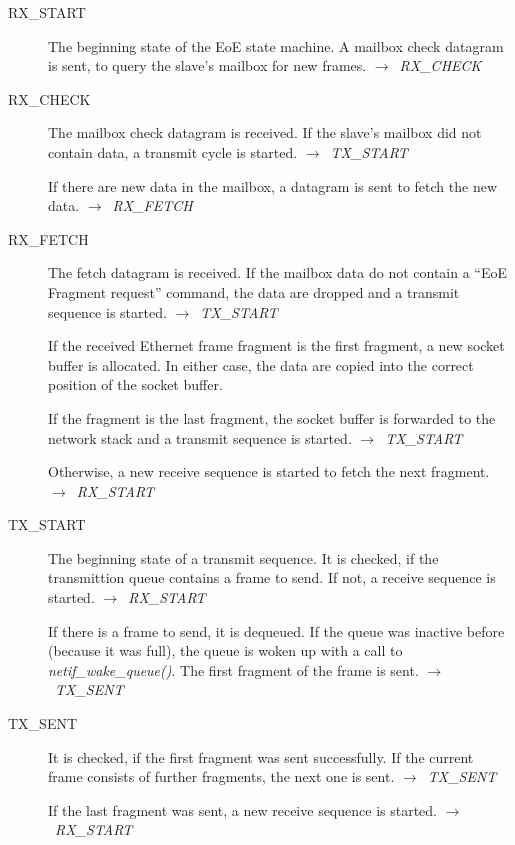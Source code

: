 \documentclass[a4paper,12pt,BCOR6mm,bibtotoc,idxtotoc]{scrbook}
\begin{document}
\begin{description}
\item[RX\_START] The beginning state of the EoE state machine. A
  mailbox check datagram is sent, to query the slave's mailbox for new
  frames. $\rightarrow$~\textit{RX\_CHECK}

\item[RX\_CHECK] The mailbox check datagram is received. If the
  slave's mailbox did not contain data, a transmit cycle is started.
  $\rightarrow$~\textit{TX\_START}

  If there are new data in the mailbox, a datagram is sent to fetch
  the new data. $\rightarrow$~\textit{RX\_FETCH}

\item[RX\_FETCH] The fetch datagram is received. If the mailbox data
  do not contain a ``EoE Fragment request'' command, the data are
  dropped and a transmit sequence is started.
  $\rightarrow$~\textit{TX\_START}

  If the received Ethernet frame fragment is the first fragment, a new
  socket buffer is allocated. In either case, the data are copied into
  the correct position of the socket buffer.

  If the fragment is the last fragment, the socket buffer is forwarded
  to the network stack and a transmit sequence is started.
  $\rightarrow$~\textit{TX\_START}

  Otherwise, a new receive sequence is started to fetch the next
  fragment. $\rightarrow$~\textit{RX\_\-START}

\item[TX\_START] The beginning state of a transmit sequence. It is
  checked, if the transmittion queue contains a frame to send. If not,
  a receive sequence is started. $\rightarrow$~\textit{RX\_START}

  If there is a frame to send, it is dequeued. If the queue was
  inactive before (because it was full), the queue is woken up with a
  call to \textit{netif\_wake\_queue()}. The first fragment of the
  frame is sent. $\rightarrow$~\textit{TX\_SENT}

\item[TX\_SENT] It is checked, if the first fragment was sent
  successfully. If the current frame consists of further fragments,
  the next one is sent. $\rightarrow$~\textit{TX\_SENT}

  If the last fragment was sent, a new receive sequence is started.
  $\rightarrow$~\textit{RX\_START}
\end{description}
\end{document}
